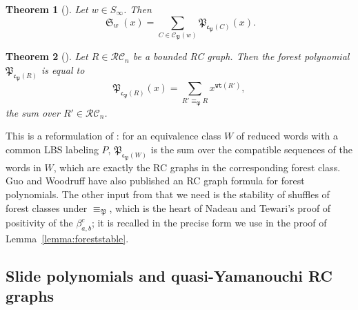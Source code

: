 \documentclass[pdflatex,sn-mathphys-num]{sn-jnl}
\numberwithin{equation}{subsection}
\DeclareMathOperator{\sch}{\mathfrak{S}}
\newcommand{\wtt}{\mathtt{wt}}
\newcommand{\RC}{\mathcal{RC}}
\newcommand{\code}{\mathfrak{c}}
\newcommand{\forest}{\mathfrak{P}}
\newcommand{\fcode}{\mathfrak{c}_\forest}
\theoremstyle{thmstyleone}
\newtheorem{theorem}{Theorem}[section]
\theoremstyle{thmstylethree}
\theoremstyle{thmstyletwo}
\begin{document}
\begin{theorem}[{\cite[Theorem~1.4]{nadeau2024forest}}] \label{theorem:forestforest}
  Let $w\in S_\infty$. Then
  $$\sch_w(x) = \sum_{C\in \mathcal{C}_\forest(w)} \forest_{\code_\forest(C)}(x).$$
\end{theorem}

\begin{theorem}[{\cite[Theorem~\ref*{B-theorem:forestformula}(I)]{samuelbialgebra}}]\label{theorem:forestformula}
Let $R\in \RC_n$ be a bounded RC graph. Then the forest polynomial $\forest_{\fcode(R)}$ is equal to
$$\forest_{\fcode(R)}(x)=\sum_{R'\equiv_{\forest} R} x^{\wtt(R')},$$
the sum over $R'\in\RC_n$.
\end{theorem}

This is a reformulation of \cite[Proposition~5.10]{nadeau2024forest}: for an equivalence class $W$ of reduced words with a common LBS labeling $P$, $\forest_{\code_\forest(W)}$ is the sum over the compatible sequences of the words in $W$, which are exactly the RC graphs in the corresponding forest class. Guo and Woodruff \cite{guo2026forest} have also published an RC graph formula for forest polynomials. The other input from \cite{nadeau2024forest} that we need is the stability of shuffles of forest classes under $\equiv_\forest$, which is the heart of Nadeau and Tewari's proof of positivity of the $\beta_{a,b}^c$; it is recalled in the precise form we use in the proof of Lemma~\ref{lemma:foreststable}.

\subsection{Slide polynomials and quasi-Yamanouchi RC graphs}\label{section:slidebackground}
\end{document}
